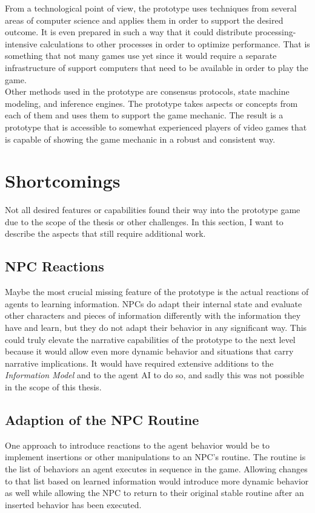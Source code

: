 From a technological point of view, the prototype uses techniques from several areas of computer science and applies them in order to support the desired outcome. It is even prepared in such a way that it could distribute processing-intensive calculations to other processes in order to optimize performance. That is something that not many games use yet since it would require a separate infrastructure of support computers that need to be available in order to play the game.\\
Other methods used in the prototype are consensus protocols, state machine modeling, and inference engines. The prototype takes aspects or concepts from each of them and uses them to support the game mechanic. The result is a prototype that is accessible to somewhat experienced players of video games that is capable of showing the game mechanic in a robust and consistent way.
\section{Shortcomings}
Not all desired features or capabilities found their way into the prototype game due to the scope of the thesis or other challenges. In this section, I want to describe the aspects that still require additional work.
\subsection{NPC Reactions}
Maybe the most crucial missing feature of the prototype is the actual reactions of agents to learning information. NPCs do adapt their internal state and evaluate other characters and pieces of information differently with the information they have and learn, but they do not adapt their behavior in any significant way. This could truly elevate the narrative capabilities of the prototype to the next level because it would allow even more dynamic behavior and situations that carry narrative implications. It would have required extensive additions to the \textit{Information Model} and to the agent AI to do so, and sadly this was not possible in the scope of this thesis.
\subsection{Adaption of the NPC Routine}
One approach to introduce reactions to the agent behavior would be to implement insertions or other manipulations to an NPC’s routine. The routine is the list of behaviors an agent executes in sequence in the game. Allowing changes to that list based on learned information would introduce more dynamic behavior as well while allowing the NPC to return to their original stable routine after an inserted behavior has been executed.
